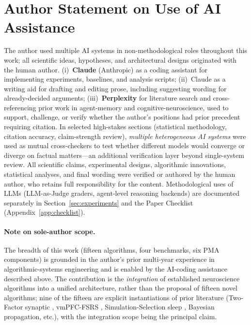 \documentclass{article}
\begin{document}
\section{Author Statement on Use of AI Assistance}
\label{sec:author-statement}

The author used multiple AI systems in non-methodological roles
throughout this work; all scientific ideas, hypotheses, and
architectural designs originated with the human author.
(i)~\textbf{Claude} (Anthropic) as a coding assistant for implementing
experiments, baselines, and analysis scripts; (ii)~Claude as a writing
aid for drafting and editing prose, including suggesting wording for
already-decided arguments; (iii)~\textbf{Perplexity} for literature
search and cross-referencing prior work in agent-memory and
cognitive-neuroscience, used to support, challenge, or verify whether
the author's positions had prior precedent requiring citation. In
selected high-stakes sections (statistical methodology, citation
accuracy, claim-strength review), \emph{multiple heterogeneous AI
systems} were used as mutual cross-checkers to test whether different
models would converge or diverge on factual matters---an additional
verification layer beyond single-system review. All scientific claims,
experimental designs, algorithmic innovations, statistical analyses,
and final wording were verified or authored by the human author, who
retains full responsibility for the content. Methodological uses of
LLMs (LLM-as-Judge graders, agent-level reasoning backends) are
documented separately in Section~\ref{sec:experiments} and the Paper
Checklist (Appendix~\ref{app:checklist}).

\paragraph{Note on sole-author scope.} The breadth of this work
(fifteen algorithms, four benchmarks, six PMA components) is grounded
in the author's prior multi-year experience in algorithmic-systems
engineering and is enabled by the AI-coding assistance described
above. The contribution is the \emph{integration} of established
neuroscience algorithms into a unified architecture, rather than
the proposal of fifteen novel algorithms; nine of the fifteen are
explicit instantiations of prior literature (Two-Factor synaptic
\citep{zenke2025}, vmPFC-FSRS \citep{zou2025}, Simulation-Selection
sleep \citep{chen2025}, Bayesian propagation, etc.), with the
integration scope being the principal claim.
\end{document}
